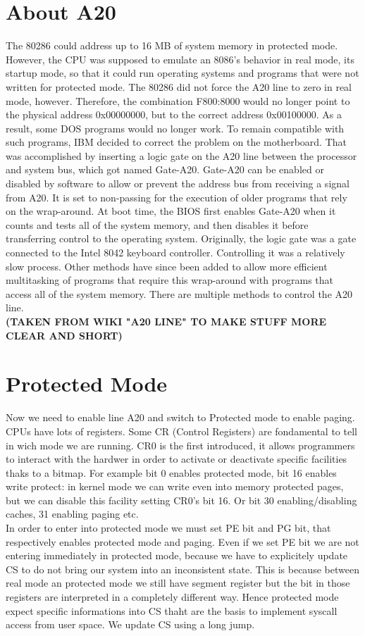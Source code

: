 \documentclass[a4paper,12pt]{article}
\begin{document}
\section{ About A20} 

The 80286 could address up to 16 MB of system memory in protected mode. However, the CPU was supposed to emulate an 8086's behavior in real mode, its startup mode, so that it could run operating systems and programs that were not written for protected mode. The 80286 did not force the A20 line to zero in real mode, however. Therefore, the combination F800:8000 would no longer point to the physical address 0x00000000, but to the correct address 0x00100000. As a result, some DOS programs would no longer work. To remain compatible with such programs, IBM decided to correct the problem on the motherboard.
That was accomplished by inserting a logic gate on the A20 line between the processor and system bus, which got named Gate-A20. Gate-A20 can be enabled or disabled by software to allow or prevent the address bus from receiving a signal from A20. It is set to non-passing for the execution of older programs that rely on the wrap-around. At boot time, the BIOS first enables Gate-A20 when it counts and tests all of the system memory, and then disables it before transferring control to the operating system.
Originally, the logic gate was a gate connected to the Intel 8042 keyboard controller. Controlling it was a relatively slow process. Other methods have since been added to allow more efficient multitasking of programs that require this wrap-around with programs that access all of the system memory. There are multiple methods to control the A20 line. \\
\textbf{(TAKEN FROM WIKI "A20 LINE" TO MAKE STUFF MORE CLEAR AND SHORT)} \\

\section{Protected Mode}
Now we need to enable line A20 and switch to Protected mode to enable paging.  CPUs have lots of registers. Some CR (Control Registers) are fondamental to tell in wich mode we are running. CR0 is the first introduced, it allows programmers to interact with the hardwer in order to activate or deactivate specific facilities thaks to a bitmap.
For example bit 0 enables protected mode, bit 16 enables write protect: in kernel mode we can write even into memory protected pages, but we can disable this facility setting CR0's bit 16. Or bit 30 enabling/disabling caches, 31 enabling paging etc. \\
In order to enter into protected mode we must set PE bit and PG bit, that respectively enables protected mode and paging.
Even if we set PE bit we are not entering immediately in protected mode, because we have to explicitely update CS to do not bring our system into an inconsistent state. This is because between real mode an protected mode we still have segment register but the bit in those registers are interpreted in a completely different way. Hence protected mode expect specific informations into CS thaht are the basis to implement syscall access from user space. We update CS using a long jump.
\end{document}

